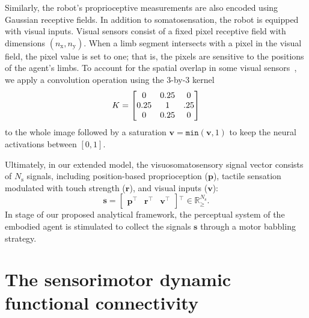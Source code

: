 \documentclass[letterpaper, 10 pt, conference]{ieeeconf}  %
\newcommand{\trsp}{{^{\top}}}
\newcommand*\circled[1]{\tikz[baseline=(char.base)]{
            \node[shape=circle,draw,inner sep=2pt] (char) {#1};}}
\begin{document}
Similarly, the robot's proprioceptive measurements are also encoded using Gaussian receptive fields. In addition to somatosensation, the robot is equipped with visual inputs. Visual sensors consist of a fixed pixel receptive field with dimensions $(n_\text{x}, n_\text{y})$. When a limb segment intersects with a pixel in the visual field, the pixel value is set to one; that is, the pixels are sensitive to the positions of the agent's limbs. To account for the spatial overlap in some visual sensors~\cite{Marshall2015}, we apply a convolution operation using the 3-by-3 kernel \[
\small
K = \begin{bmatrix} 
0 & 0.25 & 0 \\ 
0.25 & 1 & .25 \\ 
0 & 0.25 & 0 
\end{bmatrix}
\] to the whole image followed by a saturation $\bm{v}=\texttt{min}(\bm{v},1)$ to keep the neural activations between $[0,1]$.

Ultimately, in our extended model, the visuosomatosensory signal vector consists of $N_\text{s}$ signals, including position-based proprioception ($\bm{p}$), tactile sensation modulated with touch strength ($\bm{r}$), and visual inputs ($\bm{v}$):  
\begin{equation}
	\bm{s} = \begin{bmatrix}
		\bm{p}\trsp & \bm{r}\trsp & \bm{v}\trsp
	\end{bmatrix}\trsp \in \mathbb{R}^{N_\text{s}}_{\geq}.
\end{equation}
In stage \circled{1} of our proposed analytical framework, the perceptual system of the embodied agent is stimulated to collect the signals $\bm{s}$ through a motor babbling strategy.

\section{The sensorimotor dynamic functional connectivity}
\end{document}
